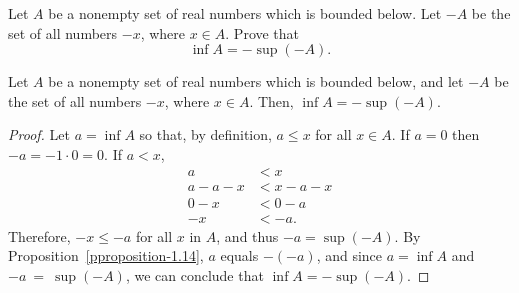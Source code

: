 \begin{exercise}
	Let $A$ be a nonempty set of real numbers which is bounded below. Let $-A$ be the set of all numbers $-x$, where $x \in A$. Prove that
	\begin{equation*}
	\inf A = - \sup \left( -A \right).
	\end{equation*}
\end{exercise}
\begin{proposition}
	Let $A$ be a nonempty set of real numbers which is bounded below, and let $-A$ be the set of all numbers $-x$, where $x \in A$. Then, $\inf A = - \sup \left( -A \right)$.
\end{proposition}
\begin{proof}
	Let $a = \inf A$ so that, by definition, $a \leq x$ for all $x \in A$. If $a = 0$ then $-a = -1 \cdot 0 = 0$. If $a < x$,
	\begin{align*}
	a &< x \\
	a - a - x &< x - a - x \\
	0 - x &< 0 - a \\
	-x &< -a.
	\end{align*}
	Therefore, $-x \leq -a$ for all $x$ in $A$, and thus $-a = \sup \left( -A \right)$.
	\newline\newline
	By Proposition~\ref{pproposition-1.14}, $a$ equals $- \left( -a \right)$, and since $a = \inf A$ and $-a~=~\sup \left( -A \right)$, we can conclude that $\inf A = - \sup \left( -A \right)$.
\end{proof}

